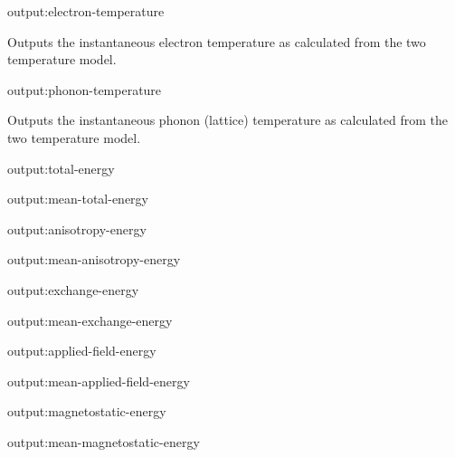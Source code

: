 {\zicf output:electron-temperature} Outputs the instantaneous electron temperature as calculated from the two temperature model.

{\zicf output:phonon-temperature} Outputs the instantaneous phonon (lattice) temperature as calculated from the two temperature model.




{\zicf output:total-energy}

{\zicf output:mean-total-energy}

{\zicf output:anisotropy-energy}

{\zicf output:mean-anisotropy-energy}

{\zicf output:exchange-energy}

{\zicf output:mean-exchange-energy}

{\zicf output:applied-field-energy}

{\zicf output:mean-applied-field-energy}

{\zicf output:magnetostatic-energy}

{\zicf output:mean-magnetostatic-energy}

